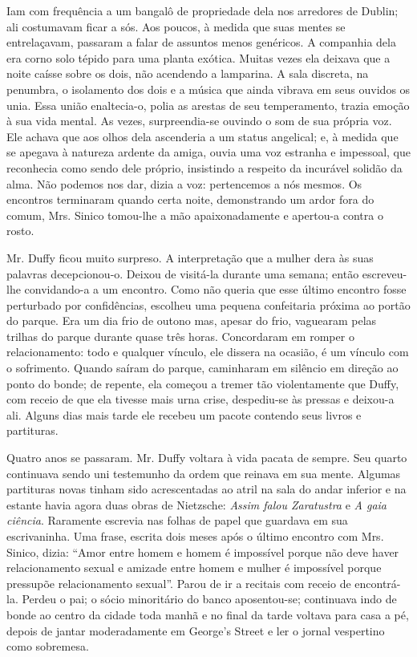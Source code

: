 Iam com frequência a um bangalô de propriedade dela nos arredores de
Dublin; ali costumavam ficar a sós. Aos poucos, à medida que suas
mentes se entrelaçavam, passaram a falar de assuntos menos genéricos.
A companhia dela era corno solo tépido para uma planta exótica.
Muitas vezes ela deixava que a noite caísse sobre os dois, não
acendendo a lamparina. A sala discreta, na penumbra, o isolamento dos
dois e a música que ainda vibrava em seus ouvidos os unia. Essa união
enaltecia-o, polia as arestas de seu temperamento, trazia emoção à sua
vida mental. As vezes, surpreendia-se ouvindo o som de sua própria
voz. Ele achava que aos olhos dela ascenderia a um status angelical;
e, à medida que se apegava à natureza ardente da amiga, ouvia uma voz
estranha e impessoal, que reconhecia como sendo dele próprio,
insistindo a respeito da incurável solidão da alma. Não podemos nos
dar, dizia a voz: pertencemos a nós mesmos. Os encontros terminaram
quando certa noite, demonstrando um ardor fora do comum, Mrs. Sinico
tomou-lhe a mão apaixonadamente e apertou-a contra o rosto.

Mr. Duffy ficou muito surpreso. A interpretação que a mulher dera às
suas palavras decepcionou-o. Deixou de visitá-la durante uma semana;
então escreveu-lhe convidando-a a um encontro. Como não queria que
esse último encontro fosse perturbado por confidências, escolheu uma
pequena confeitaria próxima ao portão do parque. Era um dia frio de
outono mas, apesar do frio, vaguearam pelas trilhas do parque durante
quase três horas. Concordaram em romper o relacionamento: todo e
qualquer vínculo, ele dissera na ocasião, é um vínculo com o
sofrimento. Quando saíram do parque, caminharam em silêncio em direção
ao ponto do bonde; de repente, ela começou a tremer tão
violentamente que Duffy, com receio de que ela tivesse mais urna
crise, despediu-se às pressas e deixou-a ali. Alguns dias mais tarde
ele recebeu um pacote contendo seus livros e partituras.

Quatro anos se passaram. Mr. Duffy voltara à vida pacata de sempre.
Seu quarto continuava sendo uni testemunho da ordem que reinava em
sua mente. Algumas partituras novas tinham sido acrescentadas ao atril
na sala do andar inferior e na estante havia agora duas obras de
Nietzsche: \textit{Assim falou Zaratustra} e \textit{A gaia ciência}. Raramente escrevia
nas folhas de papel que guardava em sua escrivaninha. Uma frase,
escrita dois meses após o último encontro com Mrs. Sinico, dizia:
``Amor entre homem e homem é impossível porque não deve haver
relacionamento sexual e amizade entre homem e mulher é impossível
porque pressupõe relacionamento sexual''. Parou de ir a recitais
com receio de encontrá-la. Perdeu o pai; o sócio minoritário do
banco aposentou-se; continuava indo de bonde ao centro da cidade toda
manhã e no final da tarde voltava para casa a pé, depois de jantar
moderadamente em George's Street e ler o jornal vespertino como
sobremesa.

